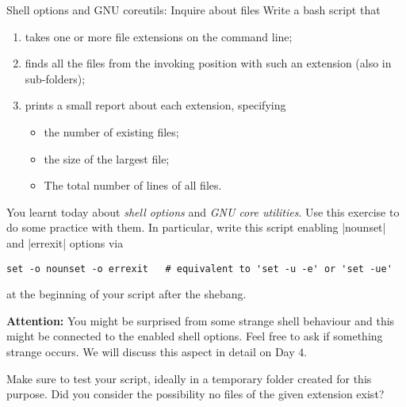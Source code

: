 
\begin{exercise}[Inspirational]{Shell options and GNU coreutils: Inquire about files}
    Write a bash script that
    \begin{enumerate}
        \item takes one or more file extensions on the command line;
        \item finds all the files from the invoking position with such an extension (also in sub-folders);
        \item prints a small report about each extension, specifying
              \begin{itemize}
                  \item the number of existing files;
                  \item the size of the largest file;
                  \item The total number of lines of all files.
              \end{itemize}
    \end{enumerate}

    You learnt today about \emph{shell options} and \emph{GNU core utilities}.
    Use this exercise to do some practice with them.
    In particular, write this script enabling \bash|nounset| and \bash|errexit| options via
    \begin{lstlisting}[style=myBash]
        set -o nounset -o errexit   # equivalent to 'set -u -e' or 'set -ue'
    \end{lstlisting}
    at the beginning of your script after the shebang.

    \textbf{Attention:} You might be surprised from some strange shell behaviour and this might be connected to the enabled shell options.
    Feel free to ask if something strange occurs.
    We will discuss this aspect in detail on Day 4.

    Make sure to test your script, ideally in a temporary folder created for this purpose.
    Did you consider the possibility no files of the given extension exist?
\end{exercise}
